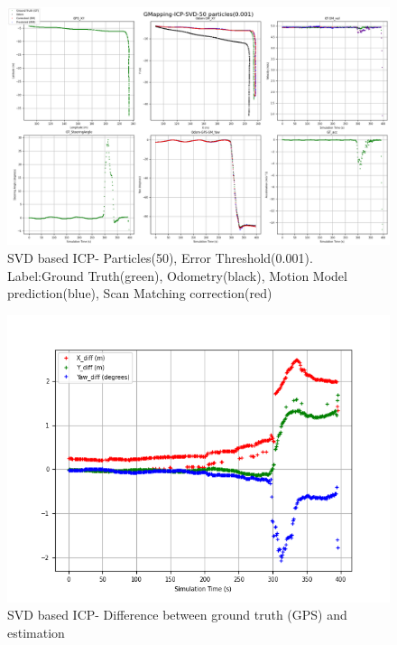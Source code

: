    \begin{figure}[h] 
        \includegraphics[height=0.6\textwidth]{images/GMapping-ICP-SVD-50 particles(0.001)_PositionParameters.png}
        \caption{SVD based ICP- Particles(50), Error Threshold(0.001). Label:Ground Truth(green), Odometry(black), Motion Model prediction(blue), Scan Matching correction(red)}
        \label{fig:SVD_50_0.001}
    \end{figure}
    \begin{figure}[h] 
        \includegraphics[height=0.4\textwidth]{images/GMapping-ICP-SVD-50 particles(0.001)_True_vs_Crct.png}
        \caption{SVD based ICP- Difference between ground truth (GPS) and estimation}
        \label{fig:SVD_50_0.001_diff}
    \end{figure}
\clearpage

